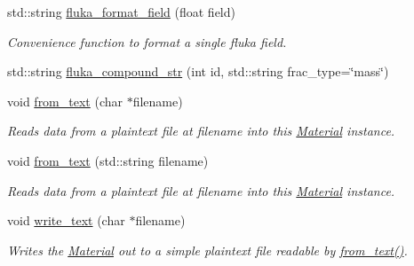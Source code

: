 \begin{DoxyCompactItemize}
std\+::string \hyperlink{classpyne_1_1_material_ab5fb8d5171b210a7c151d6bb1e180693}{fluka\+\_\+format\+\_\+field} (float field)
\begin{DoxyCompactList}\small\item\em Convenience function to format a single fluka field. \end{DoxyCompactList}\item 
std\+::string \hyperlink{classpyne_1_1_material_a3dd223f881e39c1c6014c2b79c9ee39b}{fluka\+\_\+compound\+\_\+str} (int id, std\+::string frac\+\_\+type=\char`\"{}mass\char`\"{})
\item 
\mbox{\label{classpyne_1_1_material_a28d8f7a7b06110a8be097c8e7b1fc59a}} 
void \hyperlink{classpyne_1_1_material_a28d8f7a7b06110a8be097c8e7b1fc59a}{from\+\_\+text} (char $\ast$filename)
\begin{DoxyCompactList}\small\item\em Reads data from a plaintext file at {\itshape filename} into this \hyperlink{classpyne_1_1_material}{Material} instance. \end{DoxyCompactList}\item 
\mbox{\label{classpyne_1_1_material_af74dc1341ac435f41684c935b0c9324f}} 
void \hyperlink{classpyne_1_1_material_af74dc1341ac435f41684c935b0c9324f}{from\+\_\+text} (std\+::string filename)
\begin{DoxyCompactList}\small\item\em Reads data from a plaintext file at {\itshape filename} into this \hyperlink{classpyne_1_1_material}{Material} instance. \end{DoxyCompactList}\item 
\mbox{\label{classpyne_1_1_material_a6d10e7f7dac857f59a89e1664e8b86b6}} 
void \hyperlink{classpyne_1_1_material_a6d10e7f7dac857f59a89e1664e8b86b6}{write\+\_\+text} (char $\ast$filename)
\begin{DoxyCompactList}\small\item\em Writes the \hyperlink{classpyne_1_1_material}{Material} out to a simple plaintext file readable by \hyperlink{classpyne_1_1_material_a28d8f7a7b06110a8be097c8e7b1fc59a}{from\+\_\+text()}. \end{DoxyCompactList}\item 
\mbox{\label{classpyne_1_1_material_a70706c2bc1f4776ea25932e1a5b2642b}} 

\end{DoxyCompactItemize}
